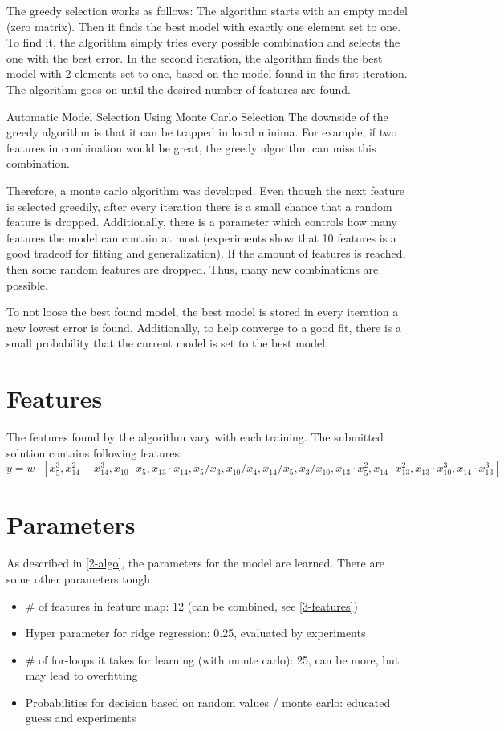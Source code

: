 \documentclass[a4paper, 11pt]{article}
\begin{document}
The greedy selection works as follows:
The algorithm starts with an empty model (zero matrix). Then it finds the best model with exactly one element set to one. To find it, the algorithm simply tries every possible combination and selects the one with the best error. In the second iteration, the algorithm finds the best model with 2 elements set to one, based on the model found in the first iteration. The algorithm goes on until the desired number of features are found.

Automatic Model Selection Using Monte Carlo Selection
The downside of the greedy algorithm is that it can be trapped in local minima. For example, if two features in combination would be great, the greedy algorithm can miss this combination.

Therefore, a monte carlo algorithm was developed. Even though the next feature is selected greedily, after every iteration there is a small chance that a random feature is dropped. Additionally, there is a parameter which controls how many features the model can contain at most (experiments show that 10 features is a good tradeoff for fitting and generalization). If the amount of features is reached, then some random features are dropped. Thus, many new combinations are possible.

To not loose the best found model, the best model is stored in every iteration a new lowest error is found. Additionally, to help converge to a good fit, there is a small probability that the current model is set to the best model.


\section{Features}
The features found by the algorithm vary with each training. The submitted solution contains following features:
$$ y = w \cdot [x_5^3, x_{14}^2 + x_{14}^3, x_{10} \cdot x_5, x_{13} \cdot x_{14}, x_{5}/x_{3}, x_{10}/x_{4}, x_{14}/x_{5}, x_{3}/x_{10}, x_{13} \cdot x_{5}^2,x_{14} \cdot x_{13}^2, x_{13} \cdot x_{10}^3, x_{14}\cdot x_{13}^3] $$
\section{Parameters}
As described in \ref{2-algo}, the parameters for the model are learned. There are some other parameters tough:
\begin{itemize}
\item \# of features in feature map: 12 (can be combined, see \ref{3-features})
\item Hyper parameter for ridge regression: 0.25, evaluated by experiments
\item \# of for-loops it takes for learning (with monte carlo): 25, can be more, but may lead to overfitting
\item Probabilities for decision based on random values / monte carlo: educated guess and experiments
\end{itemize}
\end{document}
